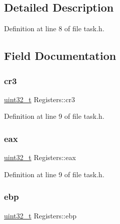 \subsection{Detailed Description}


Definition at line 8 of file task.\+h.



\subsection{Field Documentation}
\mbox{\label{a00132_ab818d6f237e6d73d321339e6fcd66abf_ab818d6f237e6d73d321339e6fcd66abf}} 
\subsubsection{\texorpdfstring{cr3}{cr3}}
{\footnotesize\ttfamily \hyperlink{a00095_a435d1572bf3f880d55459d9805097f62_a435d1572bf3f880d55459d9805097f62}{uint32\+\_\+t} Registers\+::cr3}



Definition at line 9 of file task.\+h.

\mbox{\label{a00132_aafc7189a84cb0f6ed3d37ee82bec09bc_aafc7189a84cb0f6ed3d37ee82bec09bc}} 
\subsubsection{\texorpdfstring{eax}{eax}}
{\footnotesize\ttfamily \hyperlink{a00095_a435d1572bf3f880d55459d9805097f62_a435d1572bf3f880d55459d9805097f62}{uint32\+\_\+t} Registers\+::eax}



Definition at line 9 of file task.\+h.

\mbox{\label{a00132_a1e7101b224fc3550bd4b64bb39d83036_a1e7101b224fc3550bd4b64bb39d83036}} 
\subsubsection{\texorpdfstring{ebp}{ebp}}
{\footnotesize\ttfamily \hyperlink{a00095_a435d1572bf3f880d55459d9805097f62_a435d1572bf3f880d55459d9805097f62}{uint32\+\_\+t} Registers\+::ebp}



